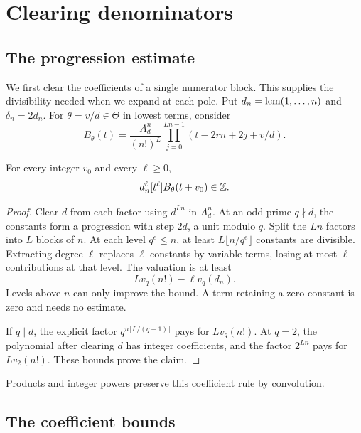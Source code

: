 \section{Clearing denominators}\label{sec:arithmetic}

\subsection{The progression estimate}

We first clear the coefficients of a single numerator block.
This supplies the divisibility needed when we expand at each pole.
Put $d_n=\operatorname{lcm}(1,\ldots,n)$ and $\delta_n=2d_n$.
For $\theta=v/d\in\Theta$ in lowest terms, consider
\[
 B_\theta(t)=\frac{A_d^n}{(n!)^L}
       \prod_{j=0}^{Ln-1}(t-2rn+2j+v/d).
\]

\begin{lemma}\label{lem:progression}
For every integer $v_0$ and every $\ell\ge0$,
\[
 d_n^\ell[t^\ell]B_\theta(t+v_0)\in\mathbb Z.
\]
\end{lemma}
\begin{proof}
Clear $d$ from each factor using $d^{Ln}$ in $A_d^n$.
At an odd prime $q\nmid d$, the constants form a progression
with step $2d$, a unit modulo $q$. Split the $Ln$ factors into
$L$ blocks of $n$. At each level $q^e\le n$, at least
$L\lfloor n/q^e\rfloor$ constants are divisible.
Extracting degree $\ell$ replaces $\ell$ constants by variable
terms, losing at most $\ell$ contributions at that level.
The valuation is at least
\[
 L v_q(n!)-\ell v_q(d_n).
\]
Levels above $n$ can only improve the bound. A term retaining
a zero constant is zero and needs no estimate.

If $q\mid d$, the explicit factor
$q^{n\lceil L/(q-1)\rceil}$ pays for $L v_q(n!)$.
At $q=2$, the polynomial after clearing $d$ has integer
coefficients, and the factor $2^{Ln}$ pays for $L v_2(n!)$.
These bounds prove the claim.
\end{proof}
Products and integer powers preserve this coefficient rule
by convolution.

\subsection{The coefficient bounds}

